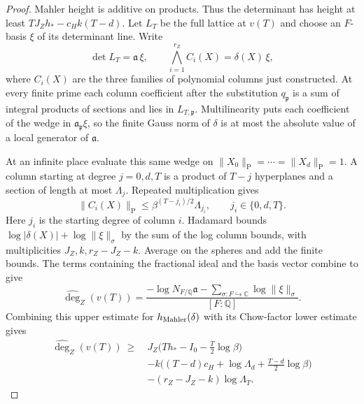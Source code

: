 \begin{proof}
Mahler height is additive on products. Thus the determinant
has height at least \(TJ_Zh_*-c_H k(T-d)\).
Let \(L_T\) be the full lattice at \(v(T)\) and choose an \(F\)-basis
\(\xi\) of its determinant line. Write
\[
  \det L_T=\mathfrak a\,\xi,\qquad
  \bigwedge_{i=1}^{r_Z} C_i(X)=\delta(X)\,\xi ,
\]
where \(C_i(X)\) are the three families of polynomial columns just constructed.
At every finite prime each column coefficient after the substitution
\(q_{\mathfrak p}\) is a sum of integral products of sections and lies in
\(L_{T,\mathfrak p}\). Multilinearity puts each coefficient of the wedge
in \(\mathfrak a_{\mathfrak p}\xi\), so the finite Gauss norm of \(\delta\)
is at most the absolute value of a local generator of \(\mathfrak a\).

At an infinite place evaluate this same wedge on
\(\|X_0\|_{\mathrm P}=\cdots=\|X_d\|_{\mathrm P}=1\).
A column starting at degree \(j=0,d,T\) is a product of \(T-j\)
hyperplanes and a section of length at most \(\Lambda_j\).
Repeated multiplication gives
\[
 \|C_i(X)\|_{\mathrm P}\le\beta^{(T-j_i)/2}\Lambda_{j_i},
 \qquad j_i\in\{0,d,T\}.
\]
Here \(j_i\) is the starting degree of column \(i\). Hadamard bounds
\(\log|\delta(X)|+\log\|\xi\|_\sigma\) by the sum of the log column
bounds, with multiplicities \(J_Z,k,r_Z-J_Z-k\). Average on the spheres
and add the finite bounds. The terms containing the fractional ideal
and the basis vector combine to give
\[
 \widehat{\deg}_Z(v(T))=
 \frac{-\log N_{F/\mathbb Q}\mathfrak a-\sum_{\sigma:F\hookrightarrow\mathbb C}
                \log\|\xi\|_\sigma}{[F:\mathbb Q]} .
\]
Combining this upper estimate for \(h_{\rm Mahler}(\delta)\) with its
Chow-factor lower estimate gives
\begin{align*}
\widehat{\deg}_Z(v(T))\ \ge\
 &J_Z\bigl(T h_*-I_0-\tfrac T2\log\beta\bigr)\\
 &-k\bigl((T-d)c_H+\log\Lambda_d
                        +\tfrac{T-d}{2}\log\beta\bigr)\\
 &-(r_Z-J_Z-k)\log\Lambda_T .
\end{align*}


\end{proof}
